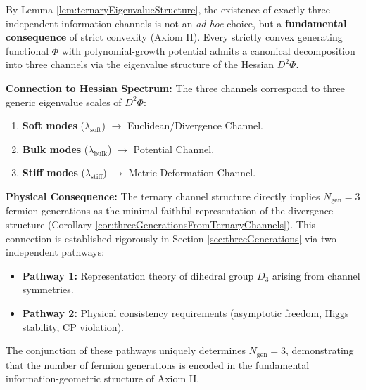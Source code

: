 \begin{definition}
\begin{lemma}
\end{lemma}

\begin{remark}
\label{rem:ternaryStructureFromAxiomII}
By Lemma \ref{lem:ternaryEigenvalueStructure}, the existence of exactly three independent information channels is not an \emph{ad hoc} choice, but a \textbf{fundamental consequence} of strict convexity (Axiom II). Every strictly convex generating functional $\Phi$ with polynomial-growth potential admits a canonical decomposition into three channels via the eigenvalue structure of the Hessian $D^2\Phi$.

\textbf{Connection to Hessian Spectrum:} The three channels correspond to three generic eigenvalue scales of $D^2\Phi$:
\begin{enumerate}
\item \textbf{Soft modes} ($\lambda_{\text{soft}}$) $\longrightarrow$ Euclidean/Divergence Channel.
\item \textbf{Bulk modes} ($\lambda_{\text{bulk}}$) $\longrightarrow$ Potential Channel.
\item \textbf{Stiff modes} ($\lambda_{\text{stiff}}$) $\longrightarrow$ Metric Deformation Channel.
\end{enumerate}

\textbf{Physical Consequence:} The ternary channel structure directly implies $N_{\mathrm{gen}} = 3$ fermion generations as the minimal faithful representation of the divergence structure (Corollary \ref{cor:threeGenerationsFromTernaryChannels}). This connection is established rigorously in Section \ref{sec:threeGenerations} via two independent pathways:
\begin{itemize}
\item \textbf{Pathway 1:} Representation theory of dihedral group $D_3$ arising from channel symmetries.
\item \textbf{Pathway 2:} Physical consistency requirements (asymptotic freedom, Higgs stability, CP violation).
\end{itemize}

The conjunction of these pathways uniquely determines $N_{\mathrm{gen}} = 3$, demonstrating that the number of fermion generations is encoded in the fundamental information-geometric structure of Axiom II.
\end{remark}

\begin{lemma}
\label{lem:spectralCompletenessChannels}


\end{lemma}
\end{definition}

